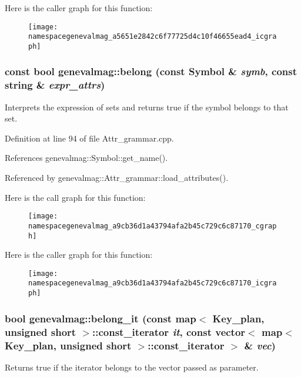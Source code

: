 Here is the caller graph for this function:\nopagebreak
\begin{figure}[H]
\begin{center}
\leavevmode
\texttt{[image: namespacegenevalmag\_a5651e2842c6f77725d4c10f46655ead4\_icgraph]}
\end{center}
\end{figure}


\hypertarget{namespacegenevalmag_a9cb36d1a43794afa2b45c729c6c87170}{
\subsubsection[{belong}]{\setlength{\rightskip}{0pt plus 5cm}const bool genevalmag::belong (const Symbol \& {\em symb}, \/  const string \& {\em expr\_\-attrs})}}
\label{namespacegenevalmag_a9cb36d1a43794afa2b45c729c6c87170}
Interprets the expression of sets and returns true if the symbol belongs to that set. 

Definition at line 94 of file Attr\_\-grammar.cpp.



References genevalmag::Symbol::get\_\-name().



Referenced by genevalmag::Attr\_\-grammar::load\_\-attributes().



Here is the call graph for this function:\nopagebreak
\begin{figure}[H]
\begin{center}
\leavevmode
\texttt{[image: namespacegenevalmag\_a9cb36d1a43794afa2b45c729c6c87170\_cgraph]}
\end{center}
\end{figure}




Here is the caller graph for this function:\nopagebreak
\begin{figure}[H]
\begin{center}
\leavevmode
\texttt{[image: namespacegenevalmag\_a9cb36d1a43794afa2b45c729c6c87170\_icgraph]}
\end{center}
\end{figure}


\hypertarget{namespacegenevalmag_ad52b23b8c38d8b9ef4c91820a512c963}{
\subsubsection[{belong\_\-it}]{\setlength{\rightskip}{0pt plus 5cm}bool genevalmag::belong\_\-it (const map$<$ Key\_\-plan, unsigned short $>$::const\_\-iterator {\em it}, \/  const vector$<$ map$<$ Key\_\-plan, unsigned short $>$::const\_\-iterator $>$ \& {\em vec})}}
\label{namespacegenevalmag_ad52b23b8c38d8b9ef4c91820a512c963}
Returns true if the iterator belongs to the vector passed as parameter. 

